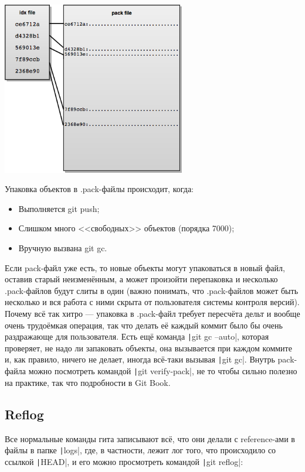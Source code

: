 \documentclass[a5paper]{article}
\begin{document}
\begin{center}
	\includegraphics[width=0.6\textwidth]{gitPackFiles.png}
\end{center}

Упаковка объектов в .pack-файлы происходит, когда:
\begin{itemize}
	\item Выполняется git push;
	\item Слишком много <<свободных>> объектов (порядка 7000);
	\item Вручную вызвана git gc.
\end{itemize}

Если pack-файл уже есть, то новые объекты могут упаковаться в новый файл, оставив старый неизменённым, а может произойти перепаковка и несколько .pack-файлов будут слиты в один (важно понимать, что .pack-файлов может быть несколько и вся работа с ними скрыта от пользователя системы контроля версий). Почему всё так хитро --- упаковка в .pack-файл требует пересчёта дельт и вообще очень трудоёмкая операция, так что делать её каждый коммит было бы очень раздражающе для пользователя. Есть ещё команда \texttt|git gc --auto|, которая проверяет, не надо ли запаковать объекты, она вызывается при каждом коммите и, как правило, ничего не делает, иногда всё-таки вызывая \texttt|git gc|. Внутрь pack-файла можно посмотреть командой \texttt|git verify-pack|, не то чтобы сильно полезно на практике, так что подробности в Git Book.

\subsection{Reflog}

Все нормальные команды гита записывают всё, что они делали с reference-ами в файлы в папке \texttt|logs|, где, в частности, лежит лог того, что происходило со ссылкой \texttt|HEAD|, и его можно просмотреть командой \texttt|git reflog|:
\end{document}
